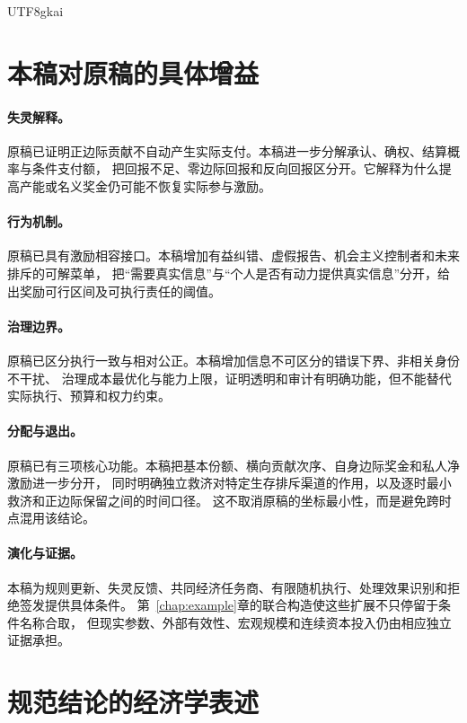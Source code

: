 \documentclass[12pt,a4paper,openany]{report}
\begin{document}
\begin{CJK*}{UTF8}{gkai}
\section{本稿对原稿的具体增益}

\paragraph{失灵解释。}
原稿已证明正边际贡献不自动产生实际支付。本稿进一步分解承认、确权、结算概率与条件支付额，
把回报不足、零边际回报和反向回报区分开。它解释为什么提高产能或名义奖金仍可能不恢复实际参与激励。

\paragraph{行为机制。}
原稿已具有激励相容接口。本稿增加有益纠错、虚假报告、机会主义控制者和未来排斥的可解菜单，
把“需要真实信息”与“个人是否有动力提供真实信息”分开，给出奖励可行区间及可执行责任的阈值。

\paragraph{治理边界。}
原稿已区分执行一致与相对公正。本稿增加信息不可区分的错误下界、非相关身份不干扰、
治理成本最优化与能力上限，证明透明和审计有明确功能，但不能替代实际执行、预算和权力约束。

\paragraph{分配与退出。}
原稿已有三项核心功能。本稿把基本份额、横向贡献次序、自身边际奖金和私人净激励进一步分开，
同时明确独立救济对特定生存排斥渠道的作用，以及逐时最小救济和正边际保留之间的时间口径。
这不取消原稿的坐标最小性，而是避免跨时点混用该结论。

\paragraph{演化与证据。}
本稿为规则更新、失灵反馈、共同经济任务商、有限随机执行、处理效果识别和拒绝签发提供具体条件。
第~\ref{chap:example}章的联合构造使这些扩展不只停留于条件名称合取，
但现实参数、外部有效性、宏观规模和连续资本投入仍由相应独立证据承担。

\section{规范结论的经济学表述}


\end{CJK*}
\end{document}
